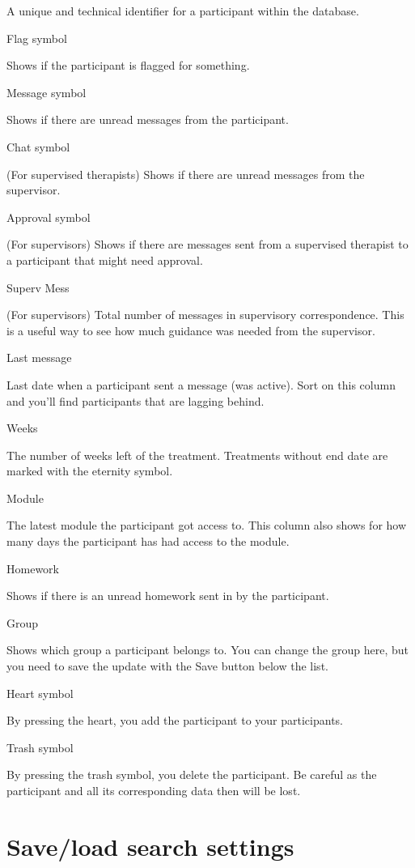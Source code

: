 \documentclass[]{book}
\begin{document}
A unique and technical identifier for a participant within the database.

Flag symbol

Shows if the participant is flagged for something.

Message symbol

Shows if there are unread messages from the participant.

Chat symbol

(For supervised therapists)
Shows if there are unread messages from the supervisor.

Approval symbol

(For supervisors)
Shows if there are messages sent from a supervised therapist to a participant that might need approval.

Superv Mess

(For supervisors)
Total number of messages in supervisory correspondence. This is a useful way to see how much guidance was needed from the supervisor.

Last message

Last date when a participant sent a message (was active). Sort on this column and you'll find participants that are lagging behind.

Weeks

The number of weeks left of the treatment.
Treatments without end date are marked with the eternity symbol.

Module

The latest module the participant got access to. This column also shows for how many days the participant has had access to the module.

Homework

Shows if there is an unread homework sent in by the participant.

Group

Shows which group a participant belongs to. You can change the group here, but you need to save the update with the Save button below the list.

Heart symbol

By pressing the heart, you add the participant to your participants.

Trash symbol

By pressing the trash symbol, you delete the participant. Be careful as the participant and all its corresponding data then will be lost.

\hypertarget{saveload-search-settings}{%
\section{Save/load search settings}\label{saveload-search-settings}}
\end{document}
